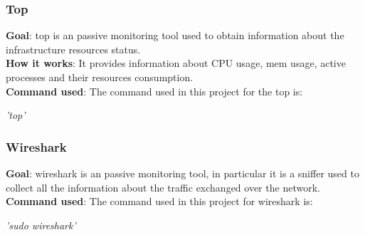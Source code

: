 \documentclass[a4paper,10pt]{article}
\begin{document}
\begin{multicols}{2}
\subsubsection*{Top}
\small\textbf{Goal}: top is an passive monitoring tool used to obtain information about the infrastructure resources status.\\
\small\textbf{How it works}: It provides information about CPU usage, mem usage, active processes and their resources consumption.\\
\small\textbf{Command used}: The command used in this project for the top is: 
\begin{center}\textit{'top'} \end{center}

\subsubsection*{Wireshark}
\small\textbf{Goal}: wireshark is an passive monitoring tool, in particular it is a sniffer used to collect all the information about the traffic
exchanged over the network.\\
\small\textbf{Command used}: The command used in this project for wireshark is:
\begin{center}\textit{'sudo wireshark'} \end{center}





\end{multicols}
\end{document}
